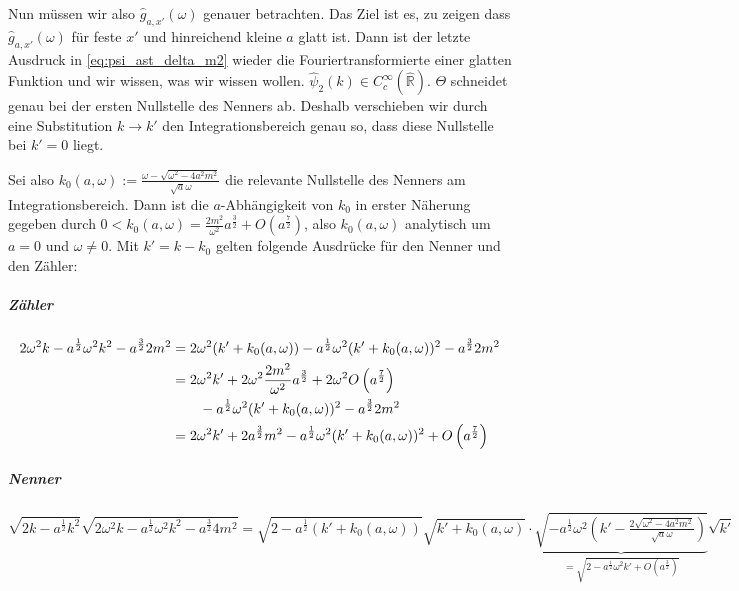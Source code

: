 Nun müssen wir also $\hat g_{a,x'}(\omega)$ genauer betrachten. Das Ziel ist es, zu zeigen dass \(\hat g_{a,x'}(\omega)\) für feste \(x'\) und hinreichend kleine \(a\) glatt ist. Dann ist der letzte Ausdruck in \cref{eq:psi_ast_delta_m2} wieder die Fouriertransformierte einer glatten Funktion und wir wissen, was wir wissen wollen.
$\hat\psi_2(k) \in C^\infty_c(\mathbb{\hat R})$. $\Theta$ schneidet genau bei der ersten Nullstelle des Nenners ab. Deshalb verschieben wir durch eine Substitution $k \rightarrow k'$ den Integrationsbereich genau so, dass diese Nullstelle bei $k' = 0$ liegt.

Sei also $k_0(a,\omega) := \frac{\omega-\sqrt{\omega^2 - 4a^2m^2}}{\sqrt{a}\omega}$ die relevante Nullstelle des Nenners am Integrationsbereich.
Dann ist die $a$-Abhängigkeit von $k_0$ in erster Näherung gegeben durch $0 < k_0(a,\omega) = \frac{2m^2}{\omega^2}a^{\frac{3}{2}} + O\left(a^{\frac{7}{2}}\right)$, also \(k_0(a,\omega)\) analytisch um \(a = 0\) und \(\omega \neq 0\).
Mit $k'=k-k_0$ gelten folgende Ausdrücke für den Nenner und den Zähler:

\subparagraph*{Zähler}
\begin{align*}
    2 \omega^2k-a^{\frac{1}{2}} \omega^2 k^2-a^{\frac{3}{2}}2m^2
    &=
    2\omega^2(k'+k_0(a,\omega))-a^{\frac{1}{2}}\omega^2(k'+k_0(a,\omega))^2-a^{\frac{3}{2}}2m^2
    \\ &=
    2 \omega^2 k' + 2 \omega^2 \frac{2m^2}{\omega^2} a^{\frac{3}{2}}
        + 2 \omega^2 O\left(a^{\frac{7}{2}}\right)
        \\  &\kern 2em-  a^{\frac{1}{2}} \omega^2(k'+k_0(a,\omega))^2
        -a^{\frac{3}{2}}2m^2
    \\ &=
    2 \omega^2k'+2a^{\frac{3}{2}}m^2-a^{\frac{1}{2}}\omega^2(k'+k_0(a,\omega))^2
        + O\left(a^{\frac{7}{2}}\right)
\end{align*}

\subparagraph*{Nenner}
\begin{dmath*}
    \sqrt{2 k-a^{\frac{1}{2}}k^2}
    \sqrt{2 \omega^2k-a^{\frac{1}{2}}\omega^2k^2-a^{\frac{3}{2}}4m^2}
    =
    \sqrt{2-a^{\frac{1}{2}}(k'+k_0(a,\omega))} \sqrt{k'+k_0(a,\omega)}
    \cdot
    \underbrace{
    \sqrt{
            -a^{\frac{1}{2}}\omega^2\left(k'-\tfrac{2\sqrt{\omega^2-4a^2m^2}}
                    {\sqrt a \omega}\right)
        }
    }_{= \sqrt{2-a^{\frac{1}{2}}\omega^2 k' + O\left(a^{\frac{3}{2}}\right)}}
    \sqrt{k'}
\end{dmath*}

